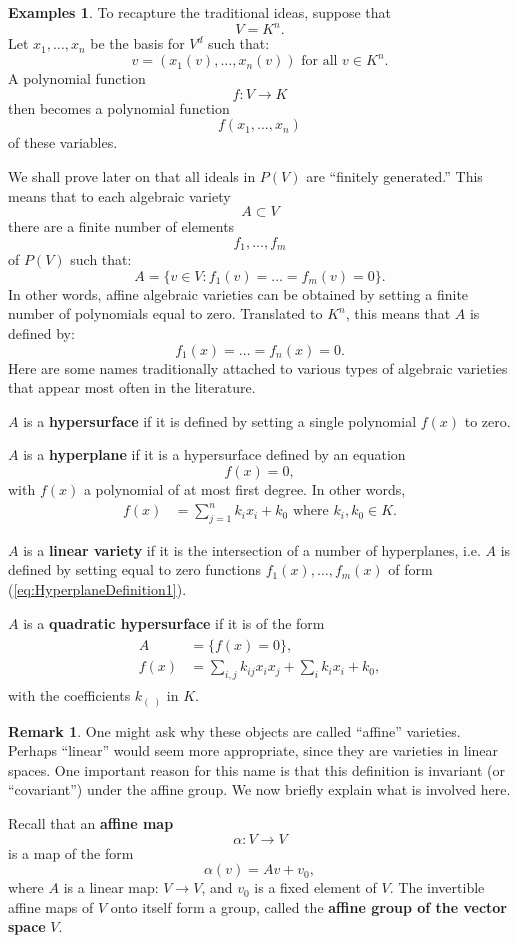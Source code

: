 \documentclass[12pt]{book}
\theoremstyle{plain}
\theoremstyle{definition}
\newtheorem*{examples}{Examples}
\newtheorem*{remark}{Remark}
\begin{document}
\begin{examples}
    To recapture the traditional ideas, suppose that
    $$V = K^n.$$
    Let $x_1, \dots, x_n$ be the basis for $V^d$ such that:
    $$v = (x_1(v), \dots, x_n(v)) \text{ for all } v \in K^n.$$
    A polynomial function
    $$f: V \to K$$
    then becomes a polynomial function
    $$f(x_1, \dots, x_n)$$
    of these variables.

    We shall prove later on that all ideals in $P(V)$ are ``finitely generated.''
    This means that to each algebraic variety
    $$A \subset V$$
    there are a finite number of elements
    $$f_1, \dots, f_m$$
    of $P(V)$ such that:
    $$A = \{v \in V: f_1(v) = \dots = f_m(v) = 0\}.$$
    In other words, affine algebraic varieties can be obtained by setting a finite number of polynomials equal to zero.
    Translated to $K^n$, this means that $A$ is defined by:
    $$f_1(x) = \dots = f_n(x) = 0.$$
    Here are some names traditionally attached to various types of algebraic varieties that appear most often in the literature.

    $A$ is a \textbf{hypersurface} if it is defined by setting a single polynomial $f(x)$ to zero.

    $A$ is a \textbf{hyperplane} if it is a hypersurface defined by an equation
    $$f(x) = 0,$$
    with $f(x)$ a polynomial of at most first degree.
    In other words,
    \begin{align} \label{eq:HyperplaneDefinition1}
        f(x) &= \sum_{j=1}^n k_ix_i + k_0 \text{ where } k_i, k_0 \in K.
    \end{align}
    
    $A$ is a \textbf{linear variety} if it is the intersection of a number of hyperplanes, i.e. $A$ is defined by setting equal to zero functions $f_1(x), \dots, f_m(x)$ of form (\ref{eq:HyperplaneDefinition1}).

    $A$ is a \textbf{quadratic hypersurface} if it is of the form
    \begin{align}
    \begin{split}
        A &= \{f(x) = 0\}, \\
        f(x) &= \sum_{i, j} k_{ij}x_ix_j + \sum_i k_ix_i + k_0,
    \end{split}
    \end{align}
    with the coefficients $k_{(\ )}$ in $K$.
\end{examples}

\begin{remark}
    One might ask why these objects are called ``affine'' varieties.
    Perhaps ``linear'' would seem more appropriate, since they are varieties in linear spaces.
    One important reason for this name is that this definition is invariant (or ``covariant'') under the affine group.
    We now briefly explain what is involved here.

    Recall that an \textbf{affine map}
    $$\alpha: V \to V$$
    is a map of the form
    $$\alpha(v) = Av + v_0,$$
    where $A$ is a linear map: $V \to V$, and $v_0$ is a fixed element of $V$.
    The invertible affine maps of $V$ onto itself form a group, called the \textbf{affine group of the vector space} $V$.
\end{remark}
\end{document}

